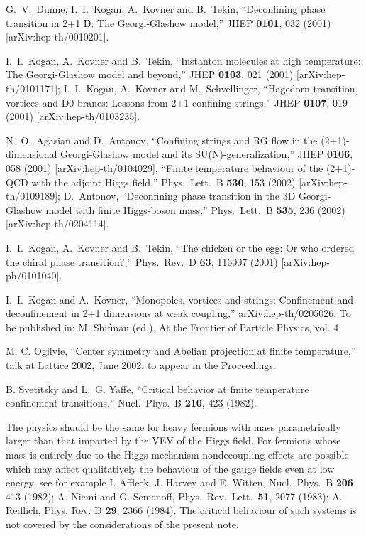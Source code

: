 \documentclass[a4paper,aps,prd,superscriptaddress,showpacs,showkeys]{revtex4}
\begin{document}
\begin{thebibliography}{99}

G.~V.~Dunne, I.~I.~Kogan, A.~Kovner and B.~Tekin,
``Deconfining phase transition in 2+1 D: The Georgi-Glashow model,''
JHEP {\bf 0101}, 032 (2001)
[arXiv:hep-th/0010201].

I.~I.~Kogan, A.~Kovner and B.~Tekin,
``Instanton molecules at high temperature: The Georgi-Glashow model and
beyond,'' 
JHEP {\bf 0103}, 021 (2001)
[arXiv:hep-th/0101171];
I.~I.~Kogan, A.~Kovner and M.~Schvellinger,
``Hagedorn transition, vortices and D0 branes: Lessons from 2+1 confining
strings,''
JHEP {\bf 0107}, 019 (2001)
[arXiv:hep-th/0103235].

N.~O.~Agasian and D.~Antonov,
``Confining strings and RG flow in the (2+1)-dimensional Georgi-Glashow
model and its SU(N)-generalization,''
JHEP {\bf 0106}, 058 (2001)
[arXiv:hep-th/0104029],
``Finite temperature behaviour of the (2+1)-QCD with the adjoint Higgs
field,''
Phys.\ Lett.\ B {\bf 530}, 153 (2002)
[arXiv:hep-th/0109189];
D.~Antonov,
``Deconfining phase transition in the 3D Georgi-Glashow model with
finite Higgs-boson mass,''
Phys.\ Lett.\ B {\bf 535}, 236 (2002)
[arXiv:hep-th/{}0204114].

I.~I.~Kogan, A.~Kovner and B.~Tekin,
``The chicken or the egg: Or who ordered the chiral phase transition?,''
Phys.\ Rev.\ D {\bf 63}, 116007 (2001)
[arXiv:hep-ph/0101040].

I.~I.~Kogan and A.~Kovner,
``Monopoles, vortices and strings: Confinement and deconfinement in  2+1
dimensions at weak coupling,''
arXiv:hep-th/0205026.
To be published in: M. Shifman (ed.), 
At the Frontier of Particle Physics, vol. 4.

M. C. Ogilvie,
``Center symmetry and Abelian projection at
finite temperature,'' 
talk at Lattice 2002, June 2002, to appear in the Proceedings.

B. Svetitsky and L.~G. Yaffe,
``Critical behavior at finite temperature confinement transitions,''
Nucl.\ Phys.\ B {\bf 210}, 423 (1982).

The physics should be the same for
heavy fermions with mass parametrically larger than that imparted
by the VEV of the Higgs field. For fermions whose mass is entirely
due to the Higgs mechanism nondecoupling effects are possible
which may affect qualitatively the behaviour of the gauge fields
even at low energy, see for example 
I. Affleck, J. Harvey and E. Witten,
Nucl.\ Phys.\ B {\bf 206}, 413 (1982); 
A. Niemi and G. Semenoff,
Phys.\ Rev.\ Lett.\ {\bf 51}, 2077 (1983);
A. Redlich,
Phys. Rev. D {\bf 29}, 2366 (1984). 
The critical behaviour of such
systems is not covered by the considerations of the present note.


\end{thebibliography}
\end{document}
